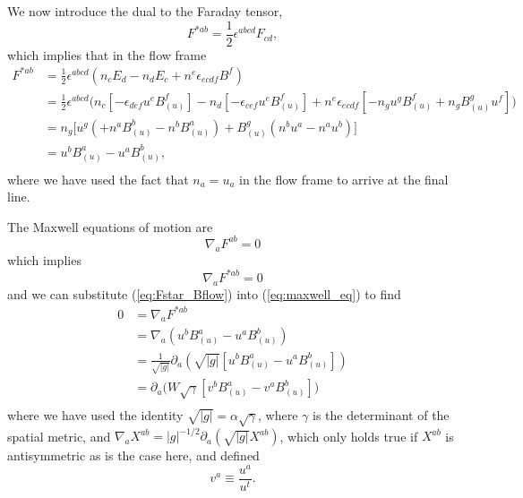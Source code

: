 \documentclass[12pt]{article}
\numberwithin{equation}{section}
\begin{document}
We now introduce the dual to the Faraday tensor,
\begin{equation}
F^{*ab} = \frac{1}{2} \epsilon^{abcd} F_{cd},
\end{equation}
which implies that in the flow frame
\begin{equation} \label{eq:Fstar_Bflow}
\begin{aligned}
F^{*ab} &= \frac{1}{2} \epsilon^{abcd} (n_c E_d - n_d E_c + n^e \epsilon_{ecdf} B^f) \\
&= \frac{1}{2} \epsilon^{abcd} \Big( n_c [-\epsilon_{def} u^e B_{(u)}^{f}] - n_d [-\epsilon_{cef} u^e B_{(u)}^{f}] + n^e \epsilon_{ecdf} [-n_g u^g B^{f}_{(u)} + n_g B^{g}_{(u)} u^f] \Big) \\
&= n_g \Big[ u^g (+ n^a B^{b}_{(u)} - n^b B^{a}_{(u)}) + B^{g}_{(u)} (n^b u^a - n^a u^b) \Big] \\
&= u^b B^{a}_{(u)} - u^a B^{b}_{(u)}, \\
\end{aligned}
\end{equation}
where we have used the fact that $n_a = u_a$ in the flow frame to arrive at the final line.

The Maxwell equations of motion are
\begin{equation}
\nabla_{a} F^{ab} = 0
\end{equation}
which implies
\begin{equation} \label{eq:maxwell_eq}
\nabla_{a} F^{*ab} = 0
\end{equation}
and we can substitute (\ref{eq:Fstar_Bflow}) into (\ref{eq:maxwell_eq}) to find
\begin{equation} \label{eq:maxwell_eq_Bu}
\begin{aligned}
0 &= \nabla_{a} F^{*ab} \\
&= \nabla_{a} (u^b B^{a}_{(u)} - u^a B^{b}_{(u)}) \\
&= \frac{1}{\sqrt{|g|}} \partial_{a} (\sqrt{|g|} [u^b B^{a}_{(u)} - u^a B^{b}_{(u)}]) \\
&= \partial_{a} \Big( W \sqrt{\gamma} [v^b B^{a}_{(u)} - v^a B^{b}_{(u)}] \Big) \\
\end{aligned}
\end{equation}
where we have used the identity $\sqrt{|g|} = \alpha \sqrt{\gamma}$, where $\gamma$ is the determinant of the spatial metric, and $\nabla_{a} X^{ab} = |g|^{-1/2} \partial_a (\sqrt{|g|} X^{ab})$, which only holds true if $X^{ab}$ is antisymmetric as is the case here, and defined
\begin{equation}
v^a \equiv \frac{u^a}{u^t}.
\end{equation}
\end{document}

